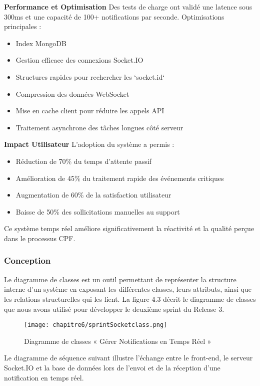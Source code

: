 \textbf{Performance et Optimisation}
Des tests de charge ont validé une latence sous 300ms et une capacité de 100+ notifications par seconde. Optimisations principales :
\begin{itemize}
    \item Index MongoDB
    \item Gestion efficace des connexions Socket.IO
    \item Structures rapides pour rechercher les `socket.id`
    \item Compression des données WebSocket
    \item Mise en cache client pour réduire les appels API
    \item Traitement asynchrone des tâches longues côté serveur
\end{itemize}

\textbf{Impact Utilisateur}
L’adoption du système a permis :
\begin{itemize}
    \item Réduction de 70\% du temps d’attente passif
    \item Amélioration de 45\% du traitement rapide des événements critiques
    \item Augmentation de 60\% de la satisfaction utilisateur
    \item Baisse de 50\% des sollicitations manuelles au support
\end{itemize}
Ce système temps réel améliore significativement la réactivité et la qualité perçue dans le processus CPF.
\subsubsection{Conception}
Le diagramme de classes est un outil permettant de représenter la structure interne d’un
système en exposant les différentes classes, leurs attributs, ainsi que les relations structurelles
qui les lient.
La figure 4.3 décrit le diagramme de classes que nous avons utilisé pour développer le deuxième
sprint du Release 3.

\begin{figure}[H]
\centering
\texttt{[image: chapitre6/sprintSocketclass.png]}
\caption{Diagramme de classes « Gérer Notifications en Temps Réel »}
\end{figure}
\clearpage
{}
Le diagramme de séquence suivant illustre l’échange entre le front-end, le serveur Socket.IO et la base de données lors de l’envoi et de la réception d’une notification en temps réel.

